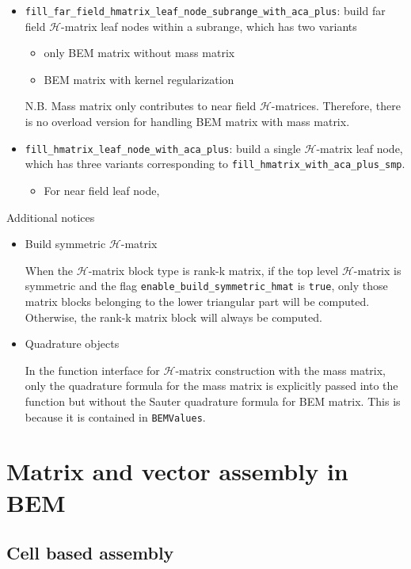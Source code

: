 \documentclass[11pt, a4paper]{book}
\begin{document}
\begin{itemize}
\item \texttt{fill\_far\_field\_hmatrix\_leaf\_node\_subrange\_with\_aca\_plus}: build
  far field $\mathcal{H}$-matrix leaf nodes within a subrange, which has two variants
  \begin{itemize}
  \item only BEM matrix without mass matrix
  \item BEM matrix with kernel regularization
  \end{itemize}
  N.B. Mass matrix only contributes to near field $\mathcal{H}$-matrices. Therefore, there
  is no overload version for handling BEM matrix with mass matrix.
\item \texttt{fill\_hmatrix\_leaf\_node\_with\_aca\_plus}: build a single
  $\mathcal{H}$-matrix leaf node, which has three variants corresponding
  to \texttt{fill\_hmatrix\_with\_aca\_plus\_smp}.
  \begin{itemize}
  \item For near field leaf node, 
  \end{itemize}
\end{itemize}

Additional notices
\begin{itemize}
\item Build symmetric $\mathcal{H}$-matrix

  When the $\mathcal{H}$-matrix block type is rank-k matrix, if the top level
  $\mathcal{H}$-matrix is symmetric and the flag \texttt{enable\_build\_symmetric\_hmat}
  is \texttt{true}, only those matrix blocks belonging to the lower triangular part will
  be computed. Otherwise, the rank-k matrix block will always be computed.
\item Quadrature objects

  In the function interface for \(\mathcal{H}\)-matrix construction with the mass matrix,
  only the quadrature formula for the mass matrix is explicitly passed into the function
  but without the Sauter quadrature formula for BEM matrix. This is because it is
  contained in \texttt{BEMValues}.
\end{itemize}

\chapter{Matrix and vector assembly in BEM}

\section{Cell based assembly}
\end{document}
